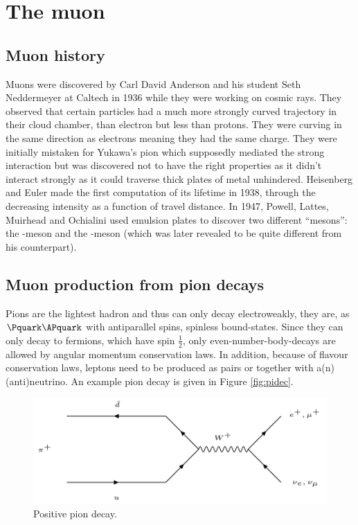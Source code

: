 

\chapter{The muon}

\section{Muon history}

Muons were discovered by Carl David Anderson and his student Seth Neddermeyer at Caltech in 1936 while they were working on cosmic rays. They observed that certain particles had a much more strongly curved trajectory in their cloud chamber, than electron but less than protons. They were curving in the same direction as electrons meaning they had the same charge. They were initially mistaken for Yukawa's pion which supposedly mediated the strong interaction but was discovered not to have the right properties as it didn't interact strongly as it could traverse thick plates of metal unhindered. Heisenberg and Euler made the first computation of its lifetime in 1938, through the decreasing intensity as a function of travel distance. In 1947, Powell, Lattes, Muirhead and Ochialini used emulsion plates to discover two different ``mesons'': the \Ppi-meson and the \Pmu-meson (which was later revealed to be quite different from his counterpart).

\section{Muon production from pion decays}

Pions are the lightest hadron and thus can only decay electroweakly, they are, as $\Pquark\APquark$ with antiparallel spins, spinless bound-states. Since they can only decay to fermions, which have spin $\frac{1}{2}$, only even-number-body-decays are allowed by angular momentum conservation laws. In addition, because of flavour conservation laws, leptons need to be produced as pairs or together with a(n) (anti)neutrino. An example pion decay is given in Figure \ref{fig:pidec}.


\begin{figure}[htbp]
\centering
\includegraphics[width=0.7\linewidth]{./fig/pideac.png}
\caption{Positive pion decay.}
\label{fig:piedec}
\end{figure}

